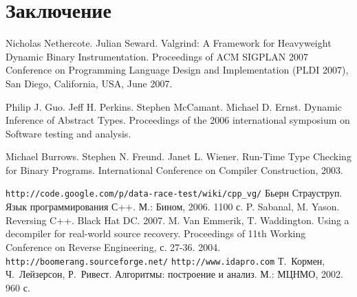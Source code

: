 \documentclass[a4paper,12pt,russian]{article}
\begin{document}
\section{Заключение}


\clearpage

\newpage
{}
\begin{thebibliography}{9}

     Nicholas Nethercote. Julian Seward. Valgrind: A Framework for Heavyweight Dynamic Binary Instrumentation. Proceedings of ACM SIGPLAN 2007 Conference on Programming Language Design and Implementation (PLDI 2007), San Diego, California, USA, June 2007.

     Philip J. Guo. Jeff H. Perkins. Stephen McCamant. Michael D. Ernst. Dynamic Inference of Abstract Types. Proceedings of the 2006 international symposium on Software testing and analysis.

     Michael Burrows. Stephen N. Freund. Janet L. Wiener. Run-Time Type Checking for Binary Programs. International Conference on Compiler Construction, 2003.

     \texttt{http://code.google.com/p/data-race-test/wiki/cpp\_vg/}
     Бьерн Страуструп. Язык программирования С++. М.: Бином, 2006. 1100 с.
    P. Sabanal, M. Yason. Reversing C++. Black Hat DC. 2007.
     M. Van Emmerik, T. Waddington. Using a decompiler for real-world source recovery. Proceedings of 11th Working Conference on Reverse Engineering, с. 27-36. 2004.
     \texttt{http://boomerang.sourceforge.net/}
     \texttt{http://www.idapro.com}
     Т.~Кормен, Ч.~Лейзерсон, Р.~Ривест. Алгоритмы: построение и анализ. М.: МЦНМО, 2002. 960 с.
\end{thebibliography}
\end{document}
